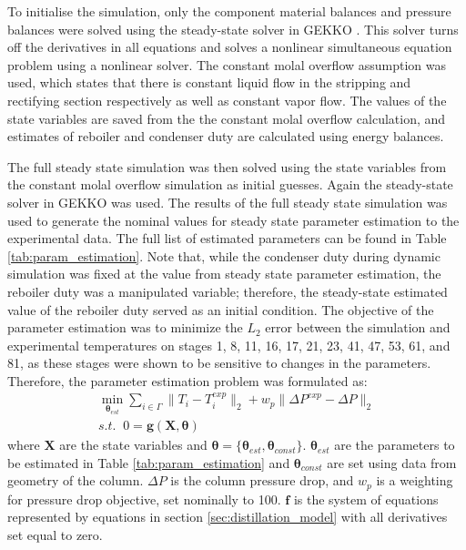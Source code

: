To initialise  the simulation, only the component material balances and pressure balances were solved using the steady-state solver in GEKKO \cite{Beal2018}. This solver turns off the derivatives in all equations and solves a nonlinear simultaneous equation problem using a nonlinear solver. The constant molal overflow assumption was used, which states that there is constant liquid flow in the stripping and rectifying section respectively as well as constant vapor flow.  The values of the state variables are saved from the the constant molal overflow calculation, and estimates of reboiler and condenser duty are calculated using energy balances.

The full steady state simulation was then solved using the state variables from the constant molal overflow simulation as initial guesses. Again the steady-state solver in  GEKKO was used. The results of the full steady state simulation was used to generate the nominal values for steady state parameter estimation to the experimental data. The full list of estimated parameters can be found in Table \ref{tab:param_estimation}. Note that, while the condenser duty during dynamic simulation was fixed at the value from steady state parameter estimation, the reboiler duty was a manipulated variable; therefore, the steady-state estimated value of the reboiler duty served as an initial condition. The objective of the parameter estimation was to minimize the $L_2$ error between the simulation and experimental temperatures on stages 1, 8, 11, 16, 17, 21, 23, 41, 47, 53, 61, and 81, as these stages were shown to be sensitive to changes in the parameters. Therefore, the parameter estimation problem was formulated as:
\begin{subequations}
    \begin{align}
        \min_{\boldsymbol \theta_{est}} \sum_{i \in \Gamma} \lVert T_i-T_i^{exp}\rVert_2 + w_p \lVert \Delta P^{exp} - \Delta P \rVert_2 \\
        s.t. \;\; 0 = \mathbf g(\mathbf X, \boldsymbol \theta)
    \end{align}
\end{subequations}
where $\mathbf X$ are the state variables and $\boldsymbol \theta = \{\boldsymbol \theta_{est}, \boldsymbol \theta_{const} \}$.  $\boldsymbol \theta_{est}$ are the parameters to be estimated in Table \ref{tab:param_estimation} and $\boldsymbol \theta_{const}$ are set using data from geometry of the column. $\Delta P$ is the column pressure drop, and $w_p$ is a weighting for pressure drop objective, set nominally to 100.  $\mathbf f$ is the system of equations represented by equations in section \ref{sec:distillation_model} with all derivatives set equal to zero. 
